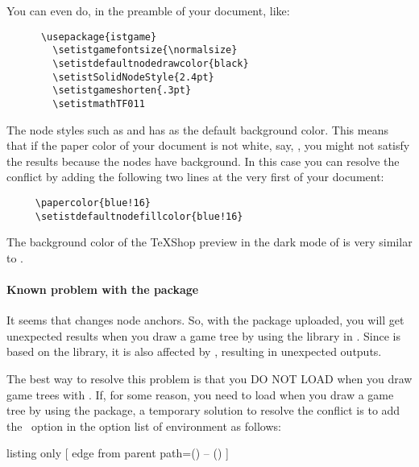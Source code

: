 You can even do, in the preamble of your document, like:

\begin{verbatim}
      \usepackage{istgame}
        \setistgamefontsize{\normalsize}
        \setistdefaultnodedrawcolor{black}
        \setistSolidNodeStyle{2.4pt}
        \setistgameshorten{.3pt}
        \setistmathTF011
\end{verbatim}

The node styles such as  and  has  as the default background color.
This means that if the paper color of your document is not white, say, , you might not satisfy the results because the nodes have  background.
In this case you can resolve the conflict by adding the following two lines at the very first of your document:
\begin{verbatim}
     \papercolor{blue!16}
     \setistdefaultnodefillcolor{blue!16}
\end{verbatim}

The background color of the TeXShop preview in the dark mode of   is very similar to .


\paragraph{Known problem with the  package}

It seems that 
 changes node anchors.
So, with the  package uploaded, you will get unexpected results
when you draw a game tree by using the  library in \TikZ.
Since  is based on the  library, it is also affected by , resulting in unexpected outputs.

The best way to resolve this problem is that you DO NOT LOAD  when you draw game trees with \TikZ.
If, for some reason, you need to load  when you draw a game tree by using the  package, a temporary solution to resolve the conflict is to add the \TikZ\ option  in the option list of  environment as follows:

\begin{tcblisting}{listing only}
  [
    edge from parent path={(\tikzparentnode) -- (\tikzchildnode)}
  ]
\end{tcblisting}

